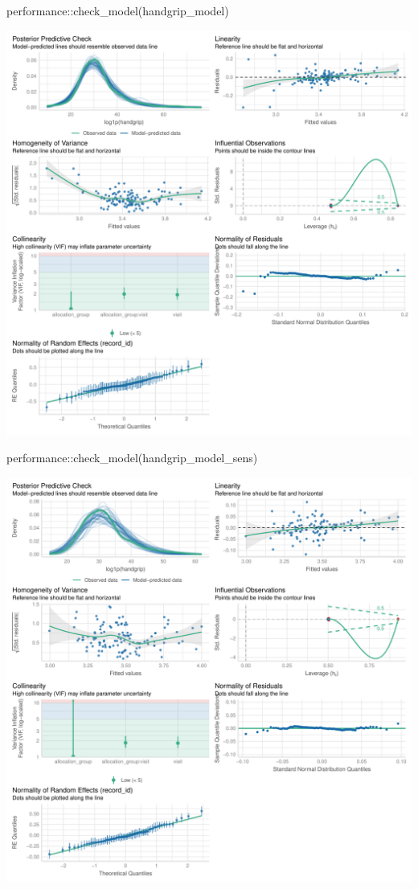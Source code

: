 \documentclass[
  letterpaper,
  DIV=11,
  numbers=noendperiod]{scrartcl}
\newenvironment{Shaded}{\begin{snugshade}}{\end{snugshade}}
\newcommand{\FunctionTok}[1]{\textcolor[rgb]{0.28,0.35,0.67}{#1}}
\newcommand{\NormalTok}[1]{\textcolor[rgb]{0.00,0.23,0.31}{#1}}
\newcommand{\SpecialCharTok}[1]{\textcolor[rgb]{0.37,0.37,0.37}{#1}}
\begin{document}
\begin{Shaded}
\begin{Highlighting}[]
\NormalTok{performance}\SpecialCharTok{::}\FunctionTok{check\_model}\NormalTok{(handgrip\_model)}
\end{Highlighting}
\end{Shaded}

\includegraphics{Outcomes_V1V2V3_files/figure-pdf/handgrip_4-1.pdf}

\begin{Shaded}
\begin{Highlighting}[]
\NormalTok{performance}\SpecialCharTok{::}\FunctionTok{check\_model}\NormalTok{(handgrip\_model\_sens)}
\end{Highlighting}
\end{Shaded}

\includegraphics{Outcomes_V1V2V3_files/figure-pdf/handgrip_4-2.pdf}
\end{document}
